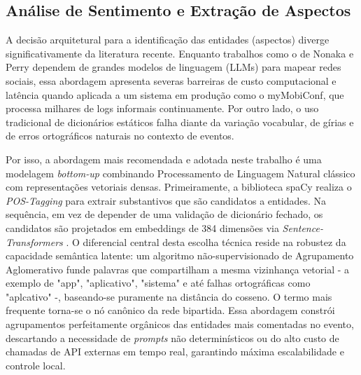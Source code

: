 \documentclass[sigconf]{webmedia}
\begin{document}
\begin{table}[h]
\centering
\caption{Evolução do volume de dados da Extração ao Processamento.}
\label{tab:volume}
\end{table}

\subsection{Análise de Sentimento e Extração de Aspectos}
A decisão arquitetural para a identificação das entidades (aspectos) diverge significativamente da literatura recente. Enquanto trabalhos como o de Nonaka e Perry \cite{nonaka} dependem de grandes modelos de linguagem (LLMs) para mapear redes sociais, essa abordagem apresenta severas barreiras de custo computacional e latência quando aplicada a um sistema em produção como o myMobiConf, que processa milhares de logs informais continuamente. Por outro lado, o uso tradicional de dicionários estáticos falha diante da variação vocabular, de gírias e de erros ortográficos naturais no contexto de eventos.

Por isso, a abordagem mais recomendada e adotada neste trabalho é uma modelagem \textit{bottom-up} combinando Processamento de Linguagem Natural clássico com representações vetoriais densas. Primeiramente, a biblioteca spaCy \cite{spacy} realiza o \textit{POS-Tagging} para extrair substantivos que são candidatos a entidades. Na sequência, em vez de depender de uma validação de dicionário fechado, os candidatos são projetados em embeddings de 384 dimensões via \textit{Sentence-Transformers} \cite{reimers}. O diferencial central desta escolha técnica reside na robustez da capacidade semântica latente: um algoritmo não-supervisionado de Agrupamento Aglomerativo funde palavras que compartilham a mesma vizinhança vetorial - a exemplo de "app", "aplicativo", "sistema" e até falhas ortográficas como "aplcativo" -, baseando-se puramente na distância do cosseno. O termo mais frequente torna-se o nó canônico da rede bipartida. Essa abordagem constrói agrupamentos perfeitamente orgânicos das entidades mais comentadas no evento, descartando a necessidade de \textit{prompts} não determinísticos ou do alto custo de chamadas de API externas em tempo real, garantindo máxima escalabilidade e controle local.
\end{document}
